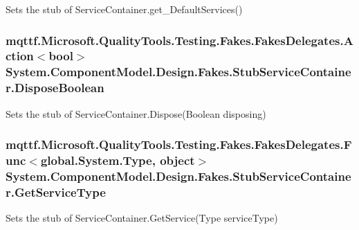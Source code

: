 Sets the stub of Service\-Container.\-get\-\_\-\-Default\-Services()

\hypertarget{class_system_1_1_component_model_1_1_design_1_1_fakes_1_1_stub_service_container_a82b5539043e3d79e170676966e5152ae}{
\subsubsection[{Dispose\-Boolean}]{\setlength{\rightskip}{0pt plus 5cm}mqttf.\-Microsoft.\-Quality\-Tools.\-Testing.\-Fakes.\-Fakes\-Delegates.\-Action$<$bool$>$ System.\-Component\-Model.\-Design.\-Fakes.\-Stub\-Service\-Container.\-Dispose\-Boolean}}\label{class_system_1_1_component_model_1_1_design_1_1_fakes_1_1_stub_service_container_a82b5539043e3d79e170676966e5152ae}


Sets the stub of Service\-Container.\-Dispose(\-Boolean disposing)

\hypertarget{class_system_1_1_component_model_1_1_design_1_1_fakes_1_1_stub_service_container_a5cace927b8988d630c75710cd5e486ec}{
\subsubsection[{Get\-Service\-Type}]{\setlength{\rightskip}{0pt plus 5cm}mqttf.\-Microsoft.\-Quality\-Tools.\-Testing.\-Fakes.\-Fakes\-Delegates.\-Func$<$global.\-System.\-Type, object$>$ System.\-Component\-Model.\-Design.\-Fakes.\-Stub\-Service\-Container.\-Get\-Service\-Type}}\label{class_system_1_1_component_model_1_1_design_1_1_fakes_1_1_stub_service_container_a5cace927b8988d630c75710cd5e486ec}


Sets the stub of Service\-Container.\-Get\-Service(\-Type service\-Type)

